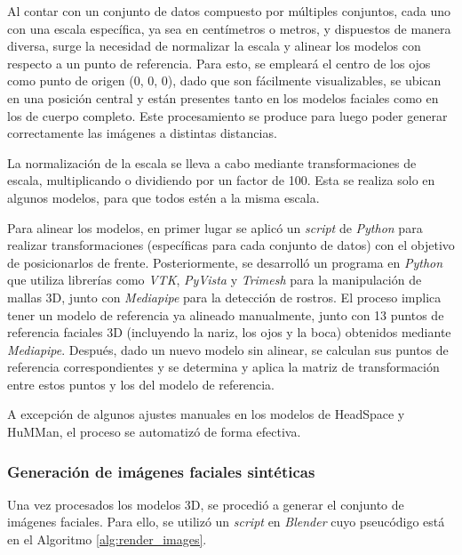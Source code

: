 Al contar con un conjunto de datos compuesto por múltiples conjuntos, cada uno con una escala específica, ya sea en centímetros o metros, y dispuestos de manera diversa, surge la necesidad de normalizar la escala y alinear los modelos con respecto a un punto de referencia. Para esto, se empleará el centro de los ojos como punto de origen (0, 0, 0), dado que son fácilmente visualizables, se ubican en una posición central y están presentes tanto en los modelos faciales como en los de cuerpo completo. Este procesamiento se produce para luego poder generar correctamente las imágenes a distintas distancias.

La normalización de la escala se lleva a cabo mediante transformaciones de escala, multiplicando o dividiendo por un factor de 100. Esta se realiza solo en algunos modelos, para que todos estén a la misma escala.

Para alinear los modelos, en primer lugar se aplicó un \textit{script} de \textit{Python} para realizar transformaciones (específicas para cada conjunto de datos) con el objetivo de posicionarlos de frente. Posteriormente, se desarrolló un programa en \textit{Python} que utiliza librerías como \textit{VTK}, \textit{PyVista} y \textit{Trimesh} para la manipulación de mallas 3D, junto con \textit{Mediapipe} para la detección de rostros. El proceso implica tener un modelo de referencia ya alineado manualmente, junto con 13 puntos de referencia faciales 3D (incluyendo la nariz, los ojos y la boca) obtenidos mediante \textit{Mediapipe}. Después, dado un nuevo modelo sin alinear, se calculan sus puntos de referencia correspondientes y se determina y aplica la matriz de transformación entre estos puntos y los del modelo de referencia.

A excepción de algunos ajustes manuales en los modelos de HeadSpace y HuMMan, el proceso se automatizó de forma efectiva.

\subsubsection{Generación de imágenes faciales sintéticas}

Una vez procesados los modelos 3D, se procedió a generar el conjunto de imágenes faciales. Para ello, se utilizó un \textit{script} en \textit{Blender} cuyo pseucódigo está en el Algoritmo \ref{alg:render_images}. 

